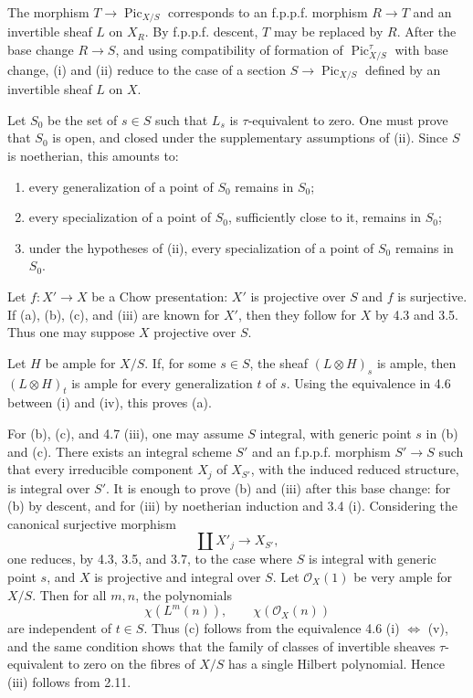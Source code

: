 \documentclass[12pt]{article}
\newcommand{\cO}{\mathcal O}
\newcommand{\Pic}{\operatorname{Pic}}
\newcommand{\longto}{\longrightarrow}
\begin{document}
The morphism $T\to \Pic_{X/S}$ corresponds to an f.p.p.f. morphism $R\to T$ and an invertible sheaf $L$ on $X_R$. By f.p.p.f. descent, $T$ may be replaced by $R$. After the base change $R\to S$, and using compatibility of formation of $\Pic^\tau_{X/S}$ with base change, (i) and (ii) reduce to the case of a section $S\to \Pic_{X/S}$ defined by an invertible sheaf $L$ on $X$.

Let $S_0$ be the set of $s\in S$ such that $L_s$ is $\tau$-equivalent to zero. One must prove that $S_0$ is open, and closed under the supplementary assumptions of (ii). Since $S$ is noetherian, this amounts to:
\begin{enumerate}[label=(\alph*)]
\item every generalization of a point of $S_0$ remains in $S_0$;
\item every specialization of a point of $S_0$, sufficiently close to it, remains in $S_0$;
\item under the hypotheses of (ii), every specialization of a point of $S_0$ remains in $S_0$.
\end{enumerate}

Let $f:X'\to X$ be a Chow presentation: $X'$ is projective over $S$ and $f$ is surjective. If (a), (b), (c), and (iii) are known for $X'$, then they follow for $X$ by 4.3 and 3.5. Thus one may suppose $X$ projective over $S$.

Let $H$ be ample for $X/S$. If, for some $s\in S$, the sheaf $(L\otimes H)_s$ is ample, then $(L\otimes H)_t$ is ample for every generalization $t$ of $s$. Using the equivalence in 4.6 between (i) and (iv), this proves (a).

For (b), (c), and 4.7 (iii), one may assume $S$ integral, with generic point $s$ in (b) and (c). There exists an integral scheme $S'$ and an f.p.p.f. morphism $S'\to S$ such that every irreducible component $X_j$ of $X_{S'}$, with the induced reduced structure, is integral over $S'$. It is enough to prove (b) and (iii) after this base change: for (b) by descent, and for (iii) by noetherian induction and 3.4 (i). Considering the canonical surjective morphism
\[
\coprod X'_j\longto X_{S'},
\]
one reduces, by 4.3, 3.5, and 3.7, to the case where $S$ is integral with generic point $s$, and $X$ is projective and integral over $S$. Let $\cO_X(1)$ be very ample for $X/S$. Then for all $m,n$, the polynomials
\[
\chi(L^m(n)),\qquad \chi(\cO_X(n))
\]
are independent of $t\in S$. Thus (c) follows from the equivalence 4.6 (i) $\Leftrightarrow$ (v), and the same condition shows that the family of classes of invertible sheaves $\tau$-equivalent to zero on the fibres of $X/S$ has a single Hilbert polynomial. Hence (iii) follows from 2.11.
\end{document}
